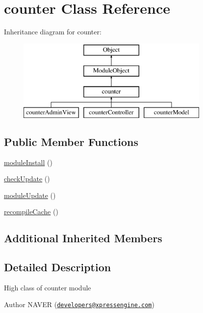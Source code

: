 \hypertarget{classcounter}{}\section{counter Class Reference}
\label{classcounter}
Inheritance diagram for counter\+:\begin{figure}[H]
\begin{center}
\leavevmode
\includegraphics[height=4.000000cm]{classcounter}
\end{center}
\end{figure}
\subsection*{Public Member Functions}
\begin{DoxyCompactItemize}
\item 
\hyperlink{classcounter_a05510fe21e12390a3cdee668b42cab5b}{module\+Install} ()
\item 
\hyperlink{classcounter_a41683d96129e79d63ce63ccde0efa2f0}{check\+Update} ()
\item 
\hyperlink{classcounter_a7c2e176fb177033a303aca925cddb046}{module\+Update} ()
\item 
\hyperlink{classcounter_a44bf39e02c7cb7c4a3c3000f9b8fba27}{recompile\+Cache} ()
\end{DoxyCompactItemize}
\subsection*{Additional Inherited Members}


\subsection{Detailed Description}
High class of counter module

\begin{DoxyAuthor}{Author}
N\+A\+V\+ER (\href{mailto:developers@xpressengine.com}{\tt developers@xpressengine.\+com}) 
\end{DoxyAuthor}


